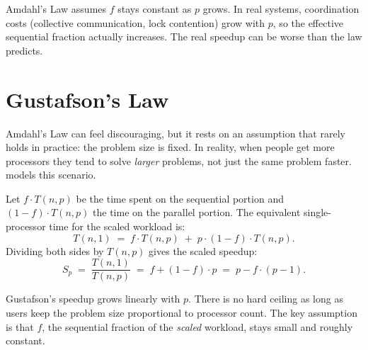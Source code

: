 \begin{pppitfall}
Amdahl's Law assumes $f$ stays constant as $p$ grows.
In real systems, coordination costs (collective communication, lock
contention) grow with $p$, so the effective sequential fraction actually
increases.
The real speedup can be worse than the law predicts.
\end{pppitfall}

\section{Gustafson's Law}

Amdahl's Law can feel discouraging, but it rests on an assumption that
rarely holds in practice: the problem size is fixed.
In reality, when people get more processors they tend to solve
\emph{larger} problems, not just the same problem faster.
~\cite{gustafson1988} models this scenario.

Let $f \cdot T(n, p)$ be the time spent on the sequential portion and
$(1 - f) \cdot T(n, p)$ the time on the parallel portion.
The equivalent single-processor time for the scaled workload is:
\[
  T(n, 1) \;=\; f \cdot T(n,p) \;+\; p \cdot (1-f) \cdot T(n,p).
\]
Dividing both sides by $T(n,p)$ gives the scaled speedup:
\[
  S_p \;=\; \frac{T(n,1)}{T(n,p)}
       \;=\; f + (1 - f) \cdot p
       \;=\; p - f \cdot (p - 1).
\]

\begin{ppkey}
Gustafson's speedup grows linearly with $p$.
There is no hard ceiling as long as users keep the problem size
proportional to processor count.
The key assumption is that $f$, the sequential fraction of the
\emph{scaled} workload, stays small and roughly constant.
\end{ppkey}

